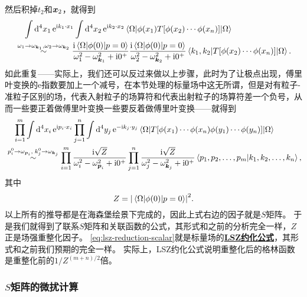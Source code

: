 \documentclass[hyperref, UTF8, a4paper]{ctexart}
\newcommand*{\ii}{\mathrm{i}}
\newcommand*{\ee}{\mathrm{e}}
\newcommand{\concept}[1]{\underline{\textbf{#1}}}
\begin{document}
然后积掉$t_2$和$\vb*{x}_2$，就得到
\begin{equation}
    \begin{aligned}
        &\quad \int \dd[4]{x_1} \ee^{\ii k_1 \cdot x_1} \int \dd[4]{x_2} \ee^{\ii k_2 \cdot x_2} \mel{\Omega}{\phi(x_1) T [\phi(x_2) \cdots \phi(x_n)]}{\Omega} \\
        &\stackrel{\omega_1 \to \omega_{\vb*{k}_1}, \omega_2 \to \omega_{\vb*{k}_2}}{\sim} \frac{\ii \mel*{\Omega}{\phi(0)}{p={0}}}{\omega_1^2 - \omega_{\vb*{k}_1}^2 + \ii 0^+} \frac{\ii \mel*{\Omega}{\phi(0)}{p={0}}}{\omega_2^2 - \omega_{\vb*{k}_2}^2 + \ii 0^+} \mel*{k_1, k_2}{T [\phi(x_2) \cdots \phi(x_n)]}{\Omega}.
    \end{aligned}
    \label{eq:scalar-correlation-pole-double}
\end{equation}
如此重复——实际上，我们还可以反过来做以上步骤，此时为了让极点出现，傅里叶变换的$\ee$指数要加上一个减号，在本节处理的标量场中这无所谓，但是对有粒子-准粒子区别的场，代表入射粒子的场算符和代表出射粒子的场算符差一个负号，从而一些要正着做傅里叶变换一些要反着做傅里叶变换——就得到
\begin{equation}
    \begin{aligned}
        &\quad \prod_{i=1}^m \int \dd[4]{x_i} \ee^{\ii p_i \cdot x_i} \prod_{j=1}^n \int \dd[4]{y_j} \ee^{- \ii k_j \cdot y_j} \mel{\Omega}{T [\phi(x_1) \cdots \phi(x_n) \phi(y_1) \cdots \phi(y_n)]}{\Omega} \\
        &\stackrel{p_i^0 \to \omega_{\vb*{p}_i}, \; k_j^0 \to \omega_{\vb*{k}_j}}{\sim} \prod_{i=1}^m \frac{\ii \sqrt{Z}}{\omega_i^2 - \omega_{\vb*{p}_i}^2 + \ii 0^+} \prod_{j=1}^n \frac{\ii \sqrt{Z}}{\omega_j^2 - \omega_{\vb*{k}_j}^2 + \ii 0^+} \braket*{p_1, p_2, \ldots, p_m}{k_1, k_2, \ldots, k_n},
    \end{aligned}
    \label{eq:lsz-reduction-scalar}
\end{equation}
其中
\begin{equation}
    Z = \abs{\mel*{\Omega}{\phi(0)}{p=0}}^2.
    \label{eq:z-factor-def}
\end{equation}
以上所有的推导都是在海森堡绘景下完成的，因此上式右边的因子就是$S$矩阵。
于是我们就得到了联系$S$矩阵和关联函数的公式，其形式和之前的分析完全一样，$Z$正是场强重整化因子。%
\eqref{eq:lsz-reduction-scalar}就是标量场的\concept{LSZ约化公式}，其形式和之前我们预期的完全一样。
实际上，LSZ约化公式说明重整化后的格林函数是重整化前的$1 / Z^{(m+n)/2}$倍。

\subsubsection{$S$矩阵的微扰计算}
\end{document}
